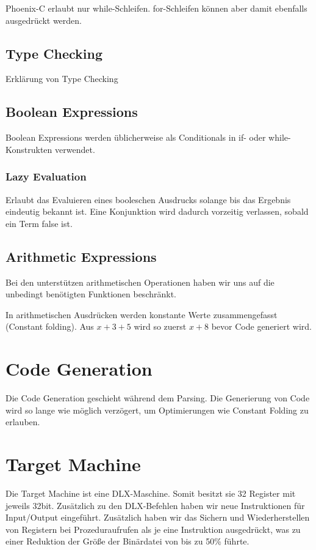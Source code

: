 \documentclass[a4paper,12pt]{article}
\begin{document}
	Phoenix-C erlaubt nur while-Schleifen.
	for-Schleifen können aber damit ebenfalls ausgedrückt werden.

	\subsection{Type Checking}
	Erklärung von Type Checking

	\subsection{Boolean Expressions}

	Boolean Expressions werden üblicherweise als Conditionals in if- oder while-Konstrukten verwendet.

	\subsubsection{Lazy Evaluation}

	Erlaubt das Evaluieren eines booleschen Ausdrucks solange bis das Ergebnis eindeutig bekannt ist.
	Eine Konjunktion wird dadurch vorzeitig verlassen, sobald ein Term false ist.

	\subsection{Arithmetic Expressions}
	Bei den unterstützen arithmetischen Operationen haben wir uns auf die unbedingt benötigten Funktionen beschränkt.

	In arithmetischen Ausdrücken werden konstante Werte zusammengefasst (Constant folding).
	Aus $x + 3 + 5$ wird so zuerst $x+8$ bevor Code generiert wird.

	\section{Code Generation}
	Die Code Generation geschieht während dem Parsing.
	Die Generierung von Code wird so lange wie möglich verzögert, um Optimierungen wie Constant Folding zu erlauben.

	\section{Target Machine}
	Die Target Machine ist eine DLX-Maschine.
	Somit besitzt sie 32 Register mit jeweils 32bit.
	Zusätzlich zu den DLX-Befehlen haben wir neue Instruktionen für Input/Output eingeführt.
	Zusätzlich haben wir das Sichern und Wiederherstellen von Registern bei Prozeduraufrufen als je eine Instruktion ausgedrückt,
	was zu einer Reduktion der Größe der Binärdatei von bis zu 50\% führte.
\end{document}
